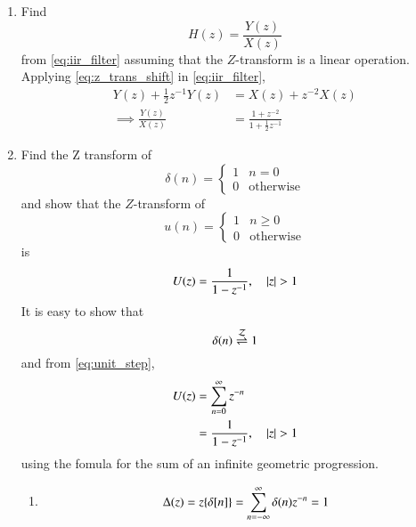 \documentclass[journal,12pt,twocolumn]{IEEEtran}
\renewcommand\thesection{\arabic{section}}
\begin{document}
\begin{enumerate}[label=\thesection.\arabic*]
		\item Find
		\begin{equation}
			H(z) = \frac{Y(z)}{X(z)}
		\end{equation}
		from  \eqref{eq:iir_filter} assuming that the $Z$-transform is a linear operation.
		\\
		\solution  Applying \eqref{eq:z_trans_shift} in \eqref{eq:iir_filter},
		\begin{align}
			Y(z) + \frac{1}{2}z^{-1}Y(z) &= X(z)+z^{-2}X(z)
			\\
			\implies \frac{Y(z)}{X(z)} &= \frac{1 + z^{-2}}{1 + \frac{1}{2}z^{-1}}
			\label{eq:freq_resp}
		\end{align}
		\item Find the Z transform of 
		\begin{equation}
			\delta(n)
			=
			\begin{cases}
				1 & n = 0
				\\
				0 & \text{otherwise}
			\end{cases}
		\end{equation}
		and show that the $Z$-transform of
		\begin{equation}
			\label{eq:unit_step}
			u(n)
			=
			\begin{cases}
				1 & n \ge 0
				\\
				0 & \text{otherwise}
			\end{cases}
		\end{equation}
		is
		\begin{equation}
			U(z) = \frac{1}{1-z^{-1}}, \quad \left\vert z\right\vert > 1
		\end{equation}
		\solution It is easy to show that
		\begin{equation}
			\delta(n) \overset{\mathcal{Z}}{ \rightleftharpoons} 1
		\end{equation}
		and from \eqref{eq:unit_step},
		\begin{align}
			U(z) &= \sum _{n= 0}^{\infty}z^{-n}
			\\
			&=\frac{1}{1-z^{-1}}, \quad \left\vert z\right\vert > 1
		\end{align}
		using the fomula for the sum of an infinite geometric progression.
		\begin{enumerate}[label=(\roman*)]
			\item \solution \begin{equation}
				\Delta(z) = z\{\delta[n]\}=\sum_{n=-\infty}^{\infty} \delta(n) z^{-n} = 1\\
			\end{equation}
			

\end{enumerate}
\end{enumerate}
\end{document}
